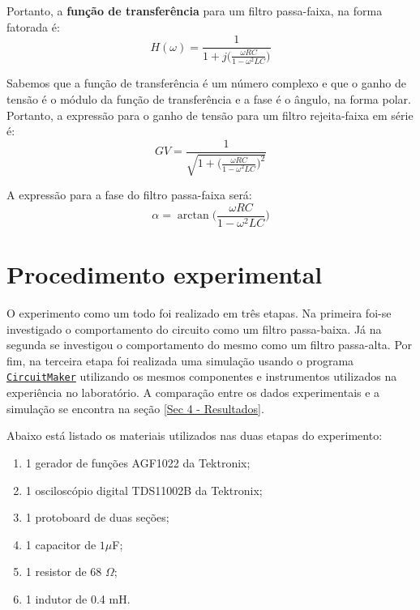 \documentclass[letterpaper, 12pt]{article}
\begin{document}
Portanto, a \textbf{função de transferência} para um filtro passa-faixa, na forma fatorada é:
\begin{equation}\label{H(omega)}
    H(\omega)=\frac{1}{1+j\Big(\frac{\omega RC}{1-\omega^{2}LC}\Big)}
\end{equation}

Sabemos que a função de transferência é um número complexo e que o ganho de tensão é o módulo da função de transferência e a fase é o ângulo, na forma polar. Portanto, a expressão para o ganho de tensão para um filtro rejeita-faixa em série é:
\begin{equation}\label{eq: Ganho de tensão}
    GV=\frac{1}{\sqrt{1+\Big(\frac{\omega RC}{1-\omega^{2}LC}\Big)^{2}}}
\end{equation}

A expressão para a fase do filtro passa-faixa será:
\begin{equation}\label{eq: Fase de um filtro}
    \alpha=\arctan{\Bigg(\frac{\omega RC}{1-\omega^{2}LC}\Bigg)}
\end{equation}





\section{Procedimento experimental}\label{Sec 3 - Experimento}
O experimento como um todo foi realizado em três etapas. Na primeira foi-se investigado o comportamento do circuito como um filtro passa-baixa. Já na segunda se investigou o comportamento do mesmo como um filtro passa-alta. Por fim, na terceira etapa foi realizada uma simulação usando o programa \href{https://docente.ifrn.edu.br/leonardoteixeira/links/instalador-do-circuitmaker-student/view}{\texttt{CircuitMaker}} utilizando os mesmos componentes e instrumentos utilizados na experiência no laboratório. A comparação entre os dados experimentais e a simulação se encontra na seção \ref{Sec 4 - Resultados}. 

Abaixo está listado os materiais utilizados nas duas etapas do experimento:
\begin{enumerate}
    \item 1 gerador de funções AGF1022 da Tektronix;
    \item 1 osciloscópio digital TDS11002B da Tektronix;
    \item 1 protoboard de duas seções;
    \item 1 capacitor de $1\mu$F;
    \item 1 resistor de 68 $\Omega$;
    \item 1 indutor de 0.4 mH.
\end{enumerate}
\end{document}
